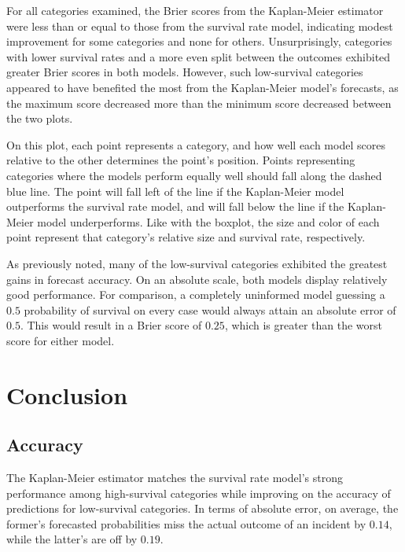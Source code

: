 \documentclass[12pt,titlepage]{article}
\begin{document}
    For all categories examined, the Brier scores from the Kaplan-Meier
    estimator were less than or equal to those from the survival rate model,
    indicating modest improvement for some categories and none for others.
    Unsurprisingly, categories with lower survival rates and a more even split
    between the outcomes exhibited greater Brier scores in both models.
    However, such low-survival categories appeared to have benefited the most
    from the Kaplan-Meier model's forecasts, as the maximum score decreased
    more than the minimum score decreased between the two plots.

    

    On this plot, each point represents a category, and how well each model
    scores relative to the other determines the point's position. Points
    representing categories where the models perform equally well should fall
    along the dashed blue line. The point will fall left of the line if the
    Kaplan-Meier model outperforms the survival rate model, and will fall below
    the line if the Kaplan-Meier model underperforms. Like with the boxplot,
    the size and color of each point represent that category's relative size
    and survival rate, respectively.

    As previously noted, many of the low-survival categories exhibited the
    greatest gains in forecast accuracy. On an absolute scale, both models
    display relatively good performance. For comparison, a completely
    uninformed model guessing a $0.5$ probability of survival on every case
    would always attain an absolute error of $0.5$. This would result in a
    Brier score of $0.25$, which is greater than the worst score for either
    model.

  \section{Conclusion}
    \subsection{Accuracy}
      The Kaplan-Meier estimator matches the survival rate model's strong
      performance among high-survival categories while improving on the
      accuracy of predictions for low-survival categories. In terms of absolute
      error, on average, the former's forecasted probabilities miss the actual
      outcome of an incident by $0.14$, while the latter's are off by $0.19$.
\end{document}
